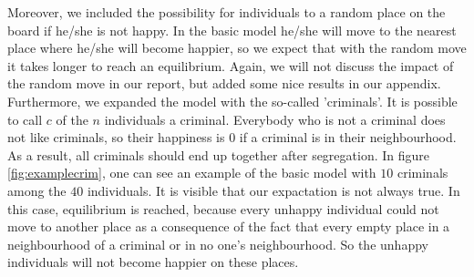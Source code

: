 Moreover, we included the possibility for individuals to a random place on the board if he/she is not happy.
In the basic model he/she will move to the nearest place where he/she will become happier, so we expect that with the random move it takes longer to reach an equilibrium.
Again, we will not discuss the impact of the random move in our report, but added some nice results in our appendix.\\

Furthermore, we expanded the model with the so-called 'criminals'.
It is possible to call $c$ of the $n$ individuals a criminal.
Everybody who is not a criminal does not like criminals, so their happiness is $0$ if a criminal is in their neighbourhood.
As a result, all criminals should end up together after segregation.
In figure \ref{fig:examplecrim}, one can see an example of the basic model with $10$ criminals among the $40$ individuals.
It is visible that our expactation is not always true.
In this case, equilibrium is reached, because every unhappy individual could not move to another place as a consequence of the fact that every empty place in a neighbourhood of a criminal or in no one's neighbourhood.
So the unhappy individuals will not become happier on these places.

